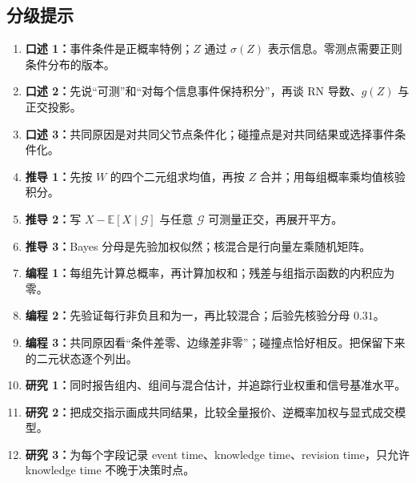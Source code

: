 \subsection*{分级提示}
\begingroup\small
\begin{enumerate}[nosep,leftmargin=*]
  \item \textbf{口述 1：}事件条件是正概率特例；$Z$ 通过 $\sigma(Z)$ 表示信息。零测点需要正则条件分布的版本。
  \item \textbf{口述 2：}先说“可测”和“对每个信息事件保持积分”，再谈 RN 导数、$g(Z)$ 与正交投影。
  \item \textbf{口述 3：}共同原因是对共同父节点条件化；碰撞点是对共同结果或选择事件条件化。
  \item \textbf{推导 1：}先按 $W$ 的四个二元组求均值，再按 $Z$ 合并；用每组概率乘均值核验积分。
  \item \textbf{推导 2：}写 $X-\mathbb E[X\mid\mathcal G]$ 与任意 $\mathcal G$ 可测量正交，再展开平方。
  \item \textbf{推导 3：}Bayes 分母是先验加权似然；核混合是行向量左乘随机矩阵。
  \item \textbf{编程 1：}每组先计算总概率，再计算加权和；残差与组指示函数的内积应为零。
  \item \textbf{编程 2：}先验证每行非负且和为一，再比较混合；后验先核验分母 $0.31$。
  \item \textbf{编程 3：}共同原因看“条件差零、边缘差非零”；碰撞点恰好相反。把保留下来的二元状态逐个列出。
  \item \textbf{研究 1：}同时报告组内、组间与混合估计，并追踪行业权重和信号基准水平。
  \item \textbf{研究 2：}把成交指示画成共同结果，比较全量报价、逆概率加权与显式成交模型。
  \item \textbf{研究 3：}为每个字段记录 event time、knowledge time、revision time，只允许 knowledge time 不晚于决策时点。
\end{enumerate}
\endgroup


\MFQMappedUpperChEightHints
